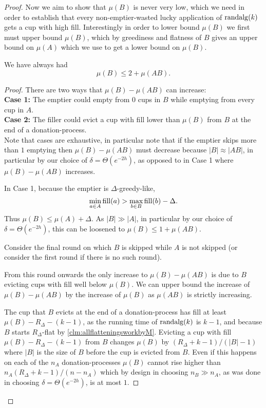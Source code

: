 \begin{proof}
Now we aim to show that $\mu(B)$ is never very low, which we need
in order to establish that every non-emptier-wasted lucky
application of $\operatorname{\text{\textup{randalg}}}(k)$ gets a cup with high fill. Interestingly
in order to lower bound $\mu(B)$ we first must upper bound
$\mu(B)$, which by greediness and flatness of $B$ gives an upper
bound on $\mu(A)$ which we use to get a lower bound on $\mu(B)$.

\begin{clm}
  \label{clm:muBdoesntgettoobig}
  We have always had
  $$\mu(B) \le 2 + \mu(A B).$$
\end{clm}
\begin{proof}
  There are two ways that $\mu(B)-\mu(A B)$ can increase: \\
  \textbf{Case 1:}
  The emptier could empty from $0$ cups in $B$ while emptying
  from every cup in $A$. \\
  \textbf{Case 2:}
  The filler could evict a cup with fill lower than $\mu(B)$ from
  $B$ at the end of a donation-process. \\

  Note that cases are exhaustive, in particular note that if the
  emptier skips more than $1$ emptying then $\mu(B) - \mu(AB)$
  must decrease because $|B|\approx |AB|$, in particular
  by our choice of $\delta = \Theta(e^{-2h})$, as opposed to in Case 1
  where $\mu(B) - \mu(AB)$ increases.

  In Case 1, because the emptier is $\Delta$-greedy-like,
  $$\min_{a\in A} \operatorname{\text{\textup{fill}}}(a) > \max_{b\in B} \operatorname{\text{\textup{fill}}}(b) - \Delta.$$
  Thus $\mu(B) \le \mu(A) + \Delta$. As $|B| \gg |A|$, in
  particular by our choice of $\delta = \Theta(e^{-2h})$, this can be
  loosened to $\mu(B) \le 1 + \mu(A B)$.

  Consider the final round on which $B$ is skipped while $A$ is
  not skipped (or consider the first round if there is no such
  round).

  From this round onwards the only increase to $\mu(B) - \mu(A
  B)$ is due to $B$ evicting cups with fill well below $\mu(B)$.
  We can upper bound the increase of $\mu(B) - \mu(A B)$ by the
  increase of $\mu(B)$ as $\mu(A B)$ is strictly increasing.

  The cup that $B$ evicts at the end of a
  donation-process has fill at least $\mu(B) - R_\Delta -
  (k-1)$, as the running time of $\operatorname{\text{\textup{randalg}}}(k)$ is $k-1$, and
  because $B$ starts $R_\Delta$-flat by
  \cref{clm:allflatteningsworkbyM}. Evicting a cup
  with fill $\mu(B) - R_\Delta - (k -1)$ from $B$ changes
  $\mu(B)$ by $(R_\Delta + k - 1) / (|B|-1)$ where $|B|$ is the
  size of $B$ before the cup is evicted from $B$. Even if this
  happens on each of the $n_A$ donation-processes $\mu(B)$ cannot
  rise higher than $n_A (R_\Delta + k-1) / (n-n_A)$ which by
  design in choosing $n_B\gg n_A$, as was done in
  choosing $\delta = \Theta(e^{-2h})$, is at most $1$.


\end{proof}
\end{proof}
